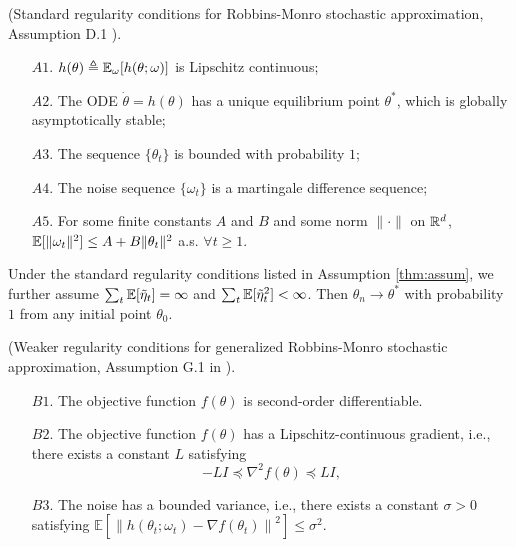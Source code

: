 \documentclass{article}
\theoremstyle{plain}
\theoremstyle{definition}
\theoremstyle{remark}
\begin{document}
		\begin{assumption}(Standard regularity conditions for Robbins-Monro stochastic approximation, Assumption D.1 \citep{tao2019fenchel}).
			\label{thm:assum}
			\vspace{-1em}
			\begin{enumerate}
				\setlength\itemsep{2pt}
				\item[$A1.$] $h(\theta)\triangleq\mathbb{E}_{\omega}[h(\theta;\omega)]$ is Lipschitz continuous;
				\item[$A2.$] The ODE $\dot{\theta} = h(\theta)$ has a unique equilibrium point $\theta^*$, which is globally asymptotically stable;
				\item[$A3.$] The sequence $\{ \theta_t \}$ is bounded with probability $1$;
				\item[$A4.$] The noise sequence $\{ \omega_t \}$ is a martingale difference sequence;
				\item[$A5.$] For some finite constants $A$ and $B$ and some norm  $\| \cdot \|$ on $\mathbb{R}^d$, $\mathbb{E}[\| \omega_t \|^2] \leq A + B \| \theta_t \|^2$ a.s. $\forall t \geq 1$. 
			\end{enumerate}
		\end{assumption}
		
		
		\begin{prop} 
			\label{thm:gsa}
			Under the standard regularity conditions listed in Assumption \ref{thm:assum}, we further assume $\sum_t \mathbb{E}[\tilde{\eta}_t] = \infty$ and $\sum_t \mathbb{E}[\tilde{\eta}_t^2] < \infty$. 
			Then $\theta_n \rightarrow \theta^*$ with probability $1$ from any initial point $\theta_0$. 
		\end{prop}
		
		\begin{assumption}(Weaker regularity conditions for generalized Robbins-Monro stochastic approximation, Assumption G.1 in \citep{tao2019fenchel}).
			\label{thm:assum_gen}
			\vspace{-1em}
			\begin{enumerate}
				\setlength\itemsep{2pt}
				\item[$B1.$] The objective function $f(\theta)$ is second-order differentiable.
				\item[$B2.$] The objective function $f(\theta)$ has a Lipschitz-continuous gradient, i.e., there exists a constant $L$ satisfying 
				\begin{equation*}
					-LI\preceq \nabla^2f(\theta)\preceq LI,
				\end{equation*}
				\item[$B3.$] The noise has a bounded variance, i.e., there exists a constant $\sigma>0$ satisfying $\mathbb{E}\left[\left\|h(\theta_t;\omega_t) - \nabla f(\theta_t)\right\|^2\right]\leq \sigma^2$.
			\end{enumerate}
		\end{assumption}
		
\end{document}
